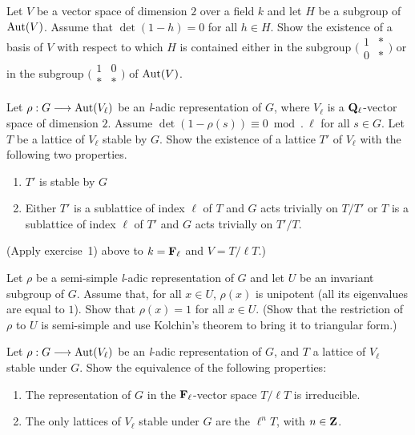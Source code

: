 \begin{exercises}
\begin{nlist}
\item Let $V$ be a vector space of dimension $2$ over a field $k$ and
let $H$ be a subgroup of $\mathrm{Aut}(V)$.  Assume that $\det(1-h) = 0$ for all
$h \in H$.  Show the existence of a basis of $V$ with respect to which
$H$ is contained either in the subgroup
$\bigl(\begin{smallmatrix} 1 & * \\ 0 & * \end{smallmatrix}\bigr)$ or in
the subgroup
$\bigl(\begin{smallmatrix} 1 & 0 \\ * & * \end{smallmatrix}\bigr)$ of
$\mathrm{Aut}(V)$.

\item Let $\rho : G \longrightarrow \mathrm{Aut}(V_\ell)$ be an \textit{l}-adic
representation of $G$, where $V_\ell$ is a $\mathbf{Q}_\ell$-vector space of
dimension $2$.  Assume $\det(1-\rho(s)) \equiv 0 \bmod.\ \ell$ for all
$s \in G$.  Let $T$ be a lattice of $V_\ell$ stable by $G$.  Show the
existence of a lattice $T'$ of $V_\ell$ with the following two
properties.
\begin{enumerate}[label=\alph*),leftmargin=2.2em,itemsep=0.15ex,topsep=0.4ex]
\item $T'$ is stable by $G$
\item Either $T'$ is a sublattice of index $\ell$ of $T$ and $G$ acts
trivially on $T/T'$ or $T$ is a sublattice of index $\ell$ of $T'$ and
$G$ acts trivially on $T'/T$.
\end{enumerate}
(Apply exercise~1) above to $k = \mathbf{F}_\ell$ and $V = T/\ell T$.)

\item Let $\rho$ be a semi-simple \textit{l}-adic representation of $G$
and let $U$ be an invariant subgroup of $G$.  Assume that, for all
$x \in U$, $\rho(x)$ is unipotent (all its eigenvalues are equal to
$1$).  Show that $\rho(x) = 1$ for all $x \in U$.  (Show that the
restriction of $\rho$ to $U$ is semi-simple and use Kolchin's theorem to
bring it to triangular form.)

\item Let $\rho : G \longrightarrow \mathrm{Aut}(V_\ell)$ be an \textit{l}-adic
representation of $G$, and $T$ a lattice of $V_\ell$ stable under $G$.
Show the equivalence of the following properties:
\begin{enumerate}[label=\alph*),leftmargin=2.2em,itemsep=0.15ex,topsep=0.4ex]
\item The representation of $G$ in the $\mathbf{F}_\ell$-vector space $T/\ell T$
is irreducible.
\item The only lattices of $V_\ell$ stable under $G$ are the $\ell^n T$,
with $n \in \mathbf{Z}$.
\end{enumerate}
\end{nlist}
\end{exercises}

